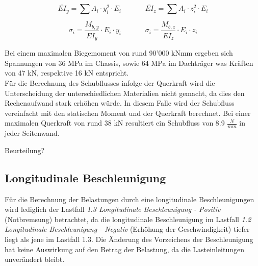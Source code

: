   \begin{equation}
    \label{eq:1}
      \overline{EI}_y = \sum A_i \cdot y_i^2 \cdot E_i \;\;\;\;\;\;\;\;\;\;\;\;  \overline{EI}_z = \sum A_i \cdot z_i^2 \cdot E_i
  \end{equation}

  \begin{equation}
    \label{eq:2}
      \sigma_i = \frac{M_{b,y}}{\overline{EI}_y}\cdot E_i \cdot y_i \;\;\;\;\;\;\;\;\;\;\;\; \sigma_i = \frac{M_{b,z}}{\overline{EI}_z}\cdot E_i \cdot z_i
  \end{equation}

  Bei einem maximalen Biegemoment von rund 90'000 kNmm ergeben sich Spannungen von 36 MPa im Chassis, sowie 64 MPa im Dachträger was Kräften von 47 kN, respektive 16 kN entspricht.\\
  Für die Berechnung des Schubflusses infolge der Querkraft wird die Unterscheidung der unterschiedlichen Materialien nicht gemacht, da dies den Rechenaufwand stark erhöhen würde. In diesem Falle wird der Schubfluss vereinfacht mit den statischen Moment und der Querkraft berechnet. Bei einer maximalen Querkraft von rund 38 kN resultiert ein Schubfluss von 8.9 $\frac{N}{mm}$ in jeder Seitenwand.

  Beurteilung?


\subsection{Longitudinale Beschleunigung}
  \label{sub:Longitudinale Beschleunigung}
  Für die Berechnung der Belastungen durch eine longitudinale Beschleunigungen wird lediglich der Lastfall \emph{1.3 Longitudinale Beschleunigung - Positiv} (Notbremsung) betrachtet, da die longitudinale Beschleunigung im Lastfall \emph{1.2 Longitudinale Beschleunigung - Negativ} (Erhöhung der Geschwindigkeit) tiefer liegt als jene im Lastfall 1.3. Die Änderung des Vorzeichens der Beschleunigung hat keine Auswirkung auf den Betrag der Belastung, da die Lasteinleitungen unverändert bleibt.

